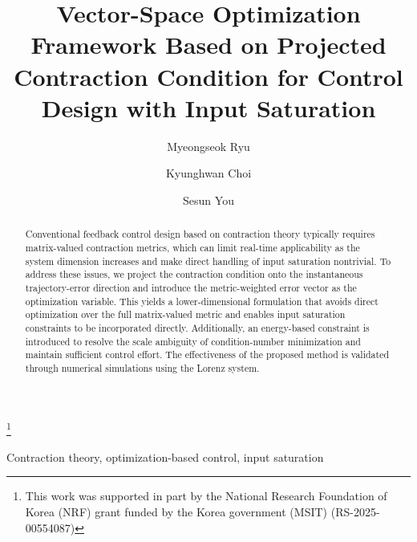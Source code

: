 \documentclass{ifacconf}
\begin{document}
\begin{frontmatter}

\title{
   Vector-Space Optimization Framework Based on Projected Contraction Condition for Control Design with Input Saturation 
} 

\thanks[footnoteinfo]{
   This work was supported in part by the National Research Foundation of Korea (NRF) grant funded by the Korea government (MSIT) (RS-2025-00554087)
}

\author[First]{Myeongseok Ryu} 
\author[First]{Kyunghwan Choi} 
\author[Second]{Sesun You}

\address[First]{
   Korea Advanced Institute of Science and Technology (KAIST), 
   Daejeon 34051, South Korea (e-mail: \{dding\_98, kh.choi\}@kaist.ac.kr)}
\address[Second]{
   Incheon National University, 
   Incheon 22012, South Korea (e-mail: yousesun@inu.ac.kr)}

\begin{abstract}                %
   Conventional feedback control design based on contraction theory typically requires matrix-valued contraction metrics, which can limit real-time applicability as the system dimension increases and make direct handling of input saturation nontrivial.
   To address these issues, we project the contraction condition onto the instantaneous trajectory-error direction and introduce the metric-weighted error vector as the optimization variable.
   This yields a lower-dimensional formulation that avoids direct optimization over the full matrix-valued metric and enables input saturation constraints to be incorporated directly.
   Additionally, an energy-based constraint is introduced to resolve the scale ambiguity of condition-number minimization and maintain sufficient control effort.
   The effectiveness of the proposed method is validated through numerical simulations using the Lorenz system.
\end{abstract}

\begin{keyword}
   Contraction theory, 
   optimization-based control,
   input saturation
\end{keyword}

\end{frontmatter}
\end{document}
